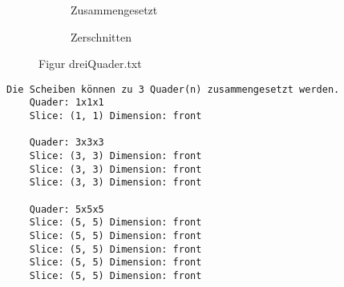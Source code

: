 \documentclass[a4paper,10pt,ngerman]{scrartcl}
\newcommand{\simplecube}[8]%
{
    \begin{scope}[shift={#1}]
        \fill[gray!40,canvas is yz plane at x=#2, opacity=#8] (0,0) rectangle (#3,#4);
        \fill[gray!10,canvas is xz plane at y=#3, opacity=#8] (0,0) rectangle (#2,#4);
        \fill[white  ,canvas is xy plane at z=#4, opacity=#8] (0,0) rectangle (#2,#3);
        \foreach\i/\j in {0/1, 1/1, 1/0}
            {
            \draw[line#5] (0,#3*\i,#4*\j) --++ (#2,0,0);
            \draw[line#6] (#2*\i,0,#4*\j) --++ (0,#3,0);
            \draw[line#7] (#2*\i,#3*\j,0) --++ (0,0,#4);
        }
    \end{scope}
}
\begin{document}
\begin{figure}[H]
\begin{subfigure}[b]{0.45\textwidth}
\begin{tikzpicture}[3d view={115}{30},line cap=round,line join=round,scale=0.4]
            \end{tikzpicture}
            \caption{Zusammengesetzt}\label{fig:figA4}
        \end{subfigure}
        \begin{subfigure}[b]{0.45\textwidth}
            \centering %
            \caption{Zerschnitten}\label{fig:figB4}
        \end{subfigure}
        \caption{Figur dreiQuader.txt}
        \label{fig:figAB4}
    \end{figure}

    \begin{lstlisting}[frame=single, title=Programmausgabe dreiQuader.txt, breaklines=true,label={lst:lstlisting5}]
    Die Scheiben können zu 3 Quader(n) zusammengesetzt werden.
    Quader: 1x1x1
    Slice: (1, 1) Dimension: front

    Quader: 3x3x3
    Slice: (3, 3) Dimension: front
    Slice: (3, 3) Dimension: front
    Slice: (3, 3) Dimension: front

    Quader: 5x5x5
    Slice: (5, 5) Dimension: front
    Slice: (5, 5) Dimension: front
    Slice: (5, 5) Dimension: front
    Slice: (5, 5) Dimension: front
    Slice: (5, 5) Dimension: front
    \end{lstlisting}
\end{document}

